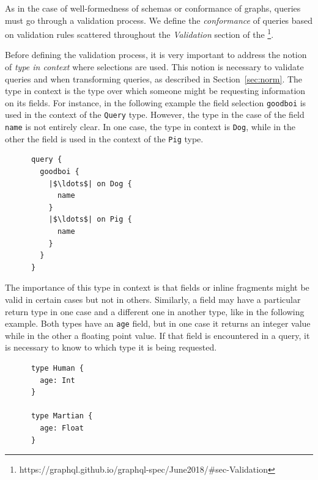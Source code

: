 As in the case of well-formedness of schemas or conformance of graphs, queries must go through a validation process. We define the \textit{conformance} of queries based on validation rules scattered throughout the \textit{Validation} section of the \spec{}\footnote{https://graphql.github.io/graphql-spec/June2018/\#sec-Validation}.

Before defining the validation process, it is very important to address the notion of \textit{type in context} where selections are used. This notion is necessary to validate queries and when transforming queries, as described in Section~\ref{sec:norm}. The type in context is the type over which someone might be requesting information on its fields. For instance, in the following example the field selection \texttt{goodboi} is used in the context of the \texttt{Query} type. However, the type in the case of the field \texttt{name} is not entirely clear. In one case, the type in context is \texttt{Dog}, while in the other the field is used in the context of the \texttt{Pig} type.

\begin{verbatim}
      query {
        goodboi {
          |$\ldots$| on Dog {
            name
          }
          |$\ldots$| on Pig {
            name
          }
        }
      }
\end{verbatim}

The importance of this type in context is that fields or inline fragments might be valid in certain cases but not in others. Similarly, a field may have a particular return type in one case and a different one in another type, like in the following example. Both types have an \texttt{age} field, but in one case it returns an integer value while in the other a floating point value. If that field is encountered in a query, it is necessary to know to which type it is being requested.

\begin{verbatim}
      type Human {
        age: Int
      }

      type Martian {
        age: Float
      }
\end{verbatim}


